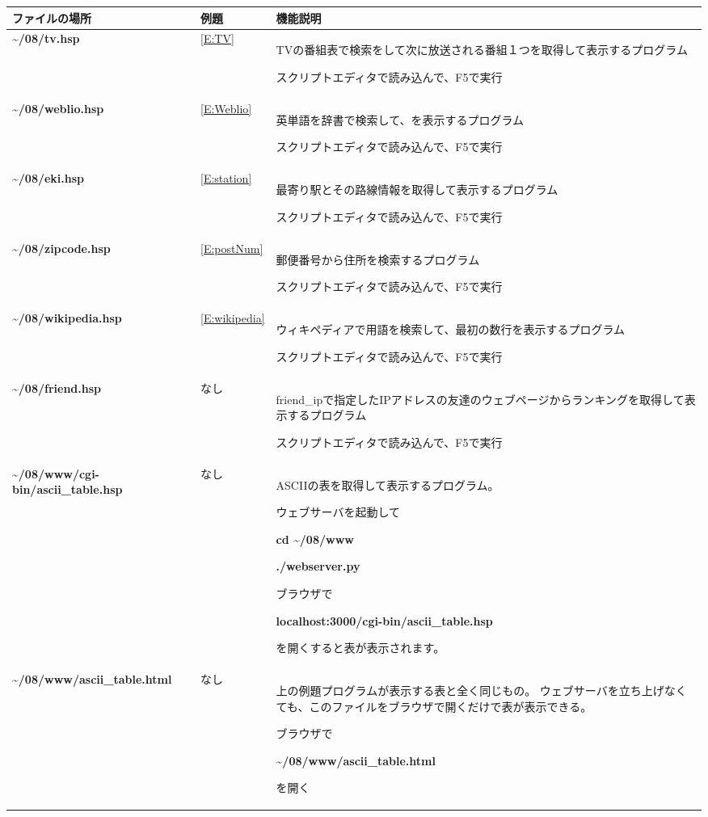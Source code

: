 \documentclass[a4paper,12pt,dvipdfmx]{jarticle}
\begin{document}
\begin{flushleft}
\tablefirsthead{}
\tablehead{}
\tabletail{}
\tablelasttail{}
\begin{supertabular}{|m{6.7730002cm}|m{2.042cm}|m{7.5810003cm}|}
\hline
ファイルの場所 &
例題 &
機能説明\\\hline
	\textbf{{\textasciitilde}/08/tv.hsp} &
\ref*{E:TV} &
TVの番組表で検索をして次に放送される番組１つを取得して表示するプログラム

スクリプトエディタで読み込んで、F5で実行\\\hline
	\textbf{{\textasciitilde}/08/weblio.hsp} &
\ref*{E:Weblio} &
英単語を辞書で検索して、を表示するプログラム

スクリプトエディタで読み込んで、F5で実行\\\hline
	\textbf{{\textasciitilde}/08/eki.hsp} &
\ref*{E:station} &
最寄り駅とその路線情報を取得して表示するプログラム

スクリプトエディタで読み込んで、F5で実行\\\hline
	\textbf{{\textasciitilde}/08/zipcode.hsp} &
\ref*{E:postNum} &
郵便番号から住所を検索するプログラム

スクリプトエディタで読み込んで、F5で実行\\\hline
	\textbf{{\textasciitilde}/08/wikipedia.hsp} &
\ref*{E:wikipedia} &
ウィキペディアで用語を検索して、最初の数行を表示するプログラム

スクリプトエディタで読み込んで、F5で実行\\\hline
	\textbf{{\textasciitilde}/08/friend.hsp} &
なし &
friend\_ipで指定したIPアドレスの友達のウェブページからランキングを取得して表示するプログラム

スクリプトエディタで読み込んで、F5で実行\\\hline
	\textbf{{\textasciitilde}/08/www/cgi-bin/ascii\_table.hsp} &
なし &
ASCIIの表を取得して表示するプログラム。

ウェブサーバを起動して

	\textbf{cd {\textasciitilde}/08/www}

	\textbf{./webserver.py}

ブラウザで

	\textbf{localhost:3000/cgi-bin/ascii\_table.hsp}

を開くすると表が表示されます。\\\hline
	\textbf{{\textasciitilde}/08/www/ascii\_table.html} &
なし &
上の例題プログラムが表示する表と全く同じもの。
	ウェブサーバを立ち上げなくても、このファイルをブラウザで開くだけで表が表示できる。

ブラウザで

	\textbf{{\textasciitilde}/08/www/ascii\_table.html}

を開く\\\hline
\end{supertabular}
\end{flushleft}
\end{document}
